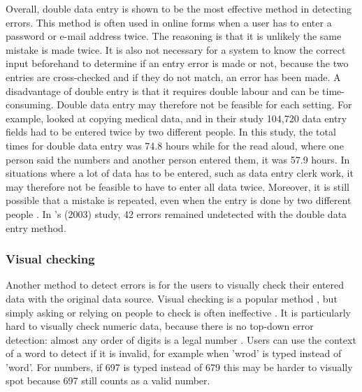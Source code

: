 \documentclass[11pt,oneside]{report}
\begin{document}
Overall, double data entry is shown to be the most effective method in detecting errors. This method is often used in online forms when a user has to enter a password or e-mail address twice. The reasoning is that it is unlikely the same mistake is made twice. It is also not necessary for a system to know the correct input beforehand to determine if an entry error is made or not, because the two entries are cross-checked and if they do not match, an error has been made. 
 A disadvantage of double entry is that it requires double labour and can be time-consuming. Double data entry may therefore not be feasible for each setting. 
For example, \citet{Kawado2003} looked at copying medical data, and in their study 104,720 data entry fields had to be entered twice by two different people. In this study, the total times for double data entry was 74.8 hours while for the read aloud, where one person said the numbers and another person entered them, it was 57.9 hours. In situations where a lot of data has to be entered, such as data entry clerk work, it may therefore not be feasible to have to enter all data twice.  Moreover, it is still possible that a mistake is repeated, even when the entry is done by two different people \citep{Nakata2014}. In \citeauthor{Kawado2003}'s (2003) study, 42 errors remained undetected with the double data entry method.

\subsubsection{Visual checking}
Another method to detect errors is for the users to visually check their entered data with the original data source. Visual checking is a popular method \citep{Tu2014}, but simply asking or relying on people to check is often ineffective \citep{Barchard2011, Nakata2014, Norman2002, Olsen2008}. It is particularly hard to visually check numeric data, because there is no top-down error detection: almost any order of digits is a legal number \citep{Lin2014, Nakata2014}. Users can use the context of a word to detect if it is invalid, for example when 'wrod' is typed instead of 'word'. For numbers, if 697 is typed instead of 679 this may be harder to visually spot because 697 still counts as a valid number. 
\end{document}
